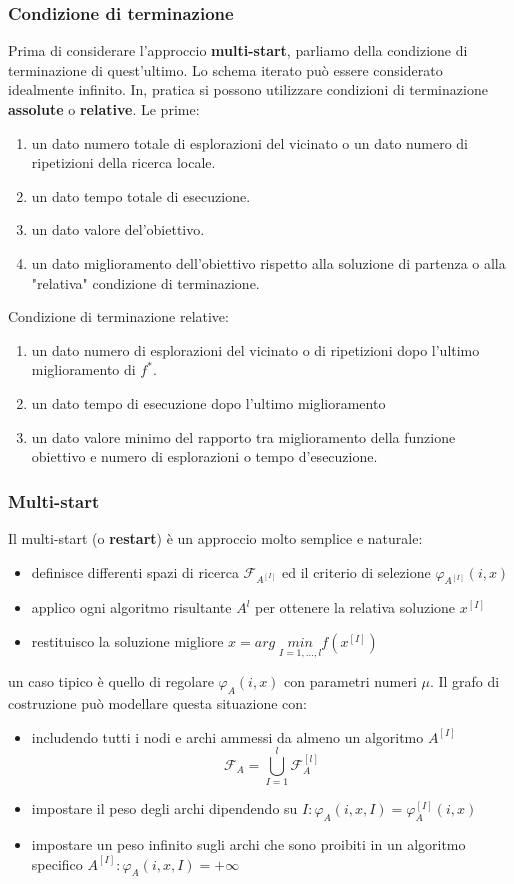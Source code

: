 \documentclass{article}
\begin{document}
\subsubsection{Condizione di terminazione}
Prima di considerare l'approccio \textbf{multi-start}, parliamo della condizione di terminazione di quest'ultimo.
Lo schema iterato può essere considerato idealmente infinito. In, pratica si possono utilizzare
condizioni di terminazione \textbf{assolute} o \textbf{relative}. Le prime:
\begin{enumerate}
    \item un dato numero totale di esplorazioni del vicinato o un dato numero di ripetizioni della ricerca
          locale.
    \item un dato tempo totale di esecuzione.
    \item un dato valore del'obiettivo.
    \item un dato miglioramento dell'obiettivo rispetto alla soluzione di partenza o alla "relativa"
          condizione di terminazione.
\end{enumerate}
Condizione di terminazione relative:
\begin{enumerate}
    \item un dato numero di esplorazioni del vicinato o di ripetizioni dopo l'ultimo miglioramento di
          $f^*$.
    \item un dato tempo di esecuzione dopo l'ultimo miglioramento
    \item un dato valore minimo del rapporto tra miglioramento della funzione obiettivo e numero di
          esplorazioni o tempo d'esecuzione.
\end{enumerate}

\subsubsection{Multi-start}
Il multi-start (o \textbf{restart}) è un approccio molto semplice e naturale:
\begin{itemize}
    \item definisce differenti spazi di ricerca $\mathcal{F}_{A^{[I]}}$ ed il criterio
          di selezione $\varphi_{A^{[I]}}(i,x)$
    \item applico ogni algoritmo risultante $A^{{l}}$ per ottenere la relativa soluzione $x^{[I]}$
    \item restituisco la soluzione migliore $x= arg\;\underset{I=1,\dots,l}{min}f\left(x^{[I]}\right)$
\end{itemize}
un caso tipico è quello di regolare $\varphi_A(i,x)$ con parametri numeri $\mu$. Il grafo di costruzione
può modellare questa situazione con:
\begin{itemize}
    \item includendo tutti i nodi e archi ammessi da almeno un algoritmo $A^{[I]}$
          $$\mathcal{F}_A=\bigcup_{I=1}^l \mathcal{F}_A^{[l]}$$
    \item impostare il peso degli archi dipendendo su $I:\varphi_A(i,x,I)=\varphi_A^{[I]}(i,x)$
    \item impostare un peso infinito sugli archi che sono proibiti in un algoritmo specifico
          $A^{[I]}:\varphi_A(i,x,I)=+\infty$
\end{itemize}
\end{document}
